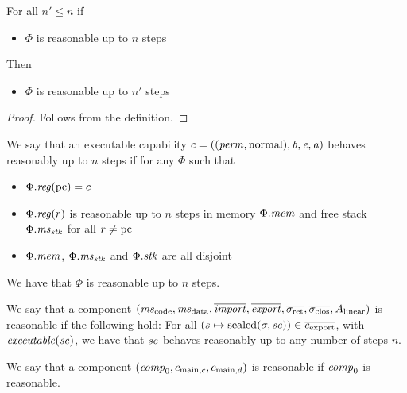 \documentclass[a4paper]{article}
\begin{document}
  \begin{lemma}
    \label{lem:ec-reasonable-downwards-closed}
    For all $n' \le n$ if
    \begin{itemize}
    \item $\Phi$ is reasonable up to $n$ steps
    \end{itemize}
    Then
    \begin{itemize}
    \item $\Phi$ is reasonable up to $n'$ steps
    \end{itemize}
  \end{lemma}
  \begin{proof}
    Follows from the definition.
  \end{proof}

  \begin{definition}[Reasonable pc]
    \label{def:reasonable-pc}
    We say that an executable capability $c =
    ((\mathit{perm},\mathrm{normal}),\mathit{b},\mathit{e},\mathit{a})$ behaves reasonably up to $n$ steps
    if for any $\Phi$ such that
    \begin{itemize}
    \item $\Phi.\reg(\pcreg) = c$
    \item $\Phi.\reg(r)$ is reasonable up to $n$ steps in memory $\Phi.\mathit{mem}$ and
      free stack $\Phi.\mathit{ms}_{\mathit{stk}}$ for all $r \neq \mathrm{pc}$
    \item $\Phi.\mathit{mem}$, $\Phi.\mathit{ms}_{\mathit{stk}}$ and $\Phi.\mathit{stk}$ are all disjoint
    \end{itemize}
    We have that $\Phi$ is reasonable up to $n$ steps.
  \end{definition}

  \begin{definition}
    \label{def:reasonable-component}
    We say that a component
    $(\mscode,\msdata,\overline{\var{import}},\overline{\var{export}},\sigrets,\sigcloss,A_\linear)$
    is reasonable if the following hold: For all $(s \mapsto \mathrm{sealed}(\sigma,\mathit{sc})) \in
    \overline{c_{\mathrm{export}}}$, with $\exec{\vsc}$, we have that $\mathit{sc}$
    behaves reasonably up to any number of steps $n$.

    We say that a component
    $(\mathit{comp}_0,c_{\mathrm{main},c}, c_{\mathrm{main},d})$ is reasonable if $\mathit{comp}_0$ is reasonable.
  \end{definition}


\end{document}
